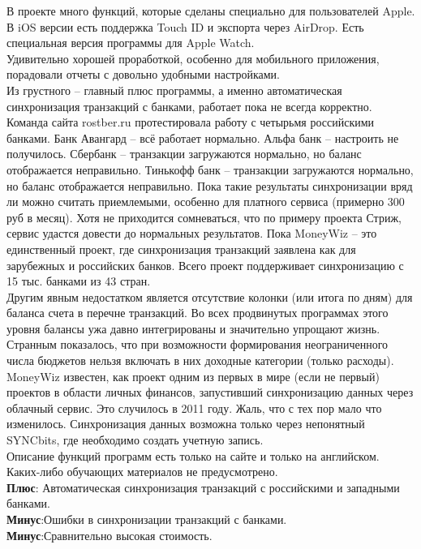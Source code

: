 В проекте много функций, которые сделаны специально для пользователей Apple. В iOS версии есть поддержка Touch ID и экспорта через AirDrop. Есть специальная версия программы для Apple Watch.\\

Удивительно хорошей проработкой, особенно для мобильного приложения, порадовали отчеты с довольно удобными настройками.\\

Из грустного – главный плюс программы, а именно автоматическая синхронизация транзакций с банками, работает пока не всегда корректно. Команда сайта rostber.ru протестировала работу с четырьмя российскими банками. Банк Авангард – всё работает нормально. Альфа банк – настроить не получилось. Сбербанк – транзакции загружаются нормально, но баланс отображается неправильно. Тинькофф банк – транзакции загружаются нормально, но баланс отображается неправильно. Пока такие результаты синхронизации вряд ли можно считать приемлемыми, особенно для платного сервиса (примерно 300 руб в месяц). Хотя не приходится сомневаться, что по примеру проекта Стриж, сервис удастся довести до нормальных результатов. Пока MoneyWiz – это единственный проект, где синхронизация транзакций заявлена как для зарубежных и российских банков. Всего проект поддерживает синхронизацию с 15 тыс. банками из 43 стран.\\

Другим явным недостатком является отсутствие колонки (или итога по дням) для баланса счета в перечне транзакций. Во всех продвинутых программах этого уровня балансы ужа давно интегрированы и значительно упрощают жизнь.\\

Странным показалось, что при возможности формирования неограниченного числа бюджетов нельзя включать в них доходные категории (только расходы).\\

MoneyWiz известен, как проект одним из первых в мире (если не первый) проектов в области личных финансов, запустивший синхронизацию данных через облачный сервис. Это случилось в 2011 году. Жаль, что с тех пор мало что изменилось. Синхронизация данных возможна только через непонятный SYNCbits, где необходимо создать учетную запись.\\

Описание функций программ есть только на сайте и только на английском. Каких-либо обучающих материалов не предусмотрено.\\

\textbf{Плюс}: Автоматическая синхронизация транзакций с российскими и западными банками.
\\
\textbf{Минус}:Ошибки в синхронизации транзакций с банками.\\
\textbf{Минус}:Сравнительно высокая стоимость.\\

